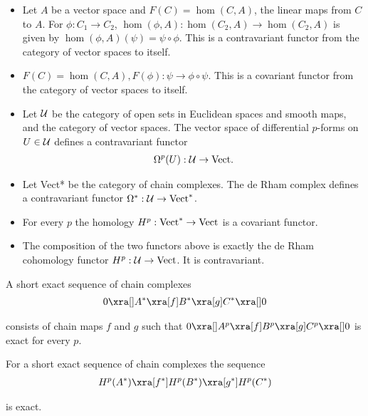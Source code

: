 \begin{itemize}
  \item Let $A$ be a vector space and $F(C) = \hom(C, A)$, the linear maps from
        $C$ to $A$. For $\phi:C_1\to C_2$, $\hom(\phi, A):\hom(C_2, A)\to \hom(C_2,A)$ is
        given by $\hom(\phi, A)(\psi) = \psi\circ\phi$. This is a contravariant functor from the
        category of vector spaces to itself.
  \item $F(C) = \hom(C, A), F(\phi):\psi \to\phi\circ\psi$. This is a covariant functor from the
        category of vector spaces to itself.
  \item Let $\mathcal{U}$ be the category of open sets in Euclidean spaces and smooth maps,
        and  the category of vector spaces. The vector space of differential
        $p$-forms on $U\in\mathcal{U}$ defines a contravariant functor
        \begin{align*}
          \Omega^p(U):\mathcal{U}\to \mathrm{Vect}.
        \end{align*}
  \item Let Vect* be the category of chain complexes. The de Rham complex
        defines a contravariant functor $\Omega^*:\mathcal{U}\to\mathrm{Vect}^*$.
  \item For every $p$ the homology $H^p:\mathrm{Vect}^*\to\mathrm{Vect}$ is a covariant functor.
  \item The composition of the two functors above is exactly the de Rham
        cohomology functor $H^p:\mathcal{U}\to\mathrm{Vect}$. It is contravariant.
\end{itemize}

A short exact sequence of chain complexes
\begin{align*}
  0\xra[] A^*\xra[f] B^*\xra[g] C^*\xra[] 0
\end{align*}

consists of chain maps $f$ and $g$ such that $0\xra[]A^p\xra[f]B^p\xra[g]C^p\xra[]0$ is exact
for every $p$.

\begin{lemma}\label{lemma:4-4}
  For a short exact sequence of chain complexes the sequence
  \begin{align*}
    H^p(A^*)\xra[f^*] H^p(B^*)\xra[g^*] H^p(C^*)
  \end{align*}

  is exact.
\end{lemma}

